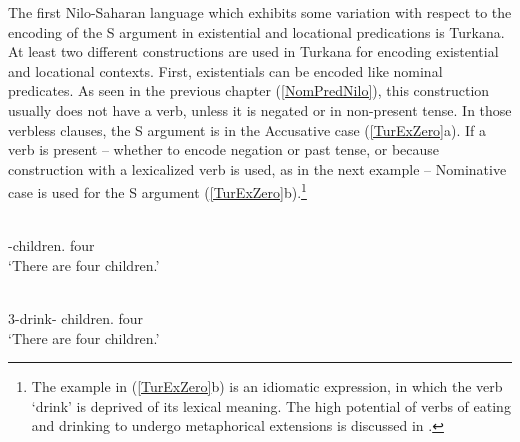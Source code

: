 The first Nilo-Saharan language which exhibits some variation with respect to the encoding of the S argument in existential and locational predications is Turkana.
At least two different constructions are used in Turkana for encoding existential and locational contexts.
First, existentials can be encoded like nominal predicates. 
As seen in the previous chapter (\ref{NomPredNilo}), this construction usually does not have a verb, unless it is negated or in non-present tense. 
In those verbless clauses, the S argument is in the Accusative case (\ref{TurExZero}a). 
If a verb is present -- whether to encode negation or past tense, or because construction with a lexicalized verb is used, as in the next example -- Nominative case is used for the S argument (\ref{TurExZero}b).\footnote{The example in (\ref{TurExZero}b) is an idiomatic expression, in which the verb `drink' is deprived of its lexical meaning. 
The high potential of verbs of eating and drinking to undergo metaphorical extensions is discussed in \citet{Newman:2009}.}

\begin{exe}\ex\label{TurExZero}
\begin{xlist}
\ex\gll{} \\
\NC{}-children.\acc{} four\\
\glt `There are four children.'

\ex\gll{}  \\
3-drink-\pl{} children.\nom{} four\\
\glt `There are four children.'
\end{xlist}
\end{exe}



